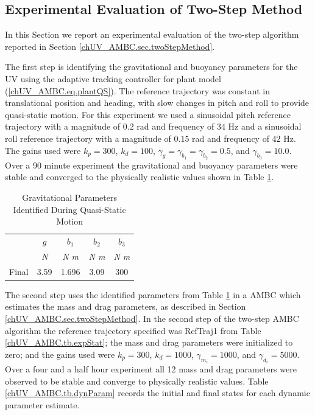 


\subsection{Experimental Evaluation of Two-Step Method}
\label{chUV_AMBC.sec.twoStepExp}

In this Section we report an experimental evaluation of the two-step
algorithm reported in Section \ref{chUV_AMBC.sec.twoStepMethod}.

The first step is identifying the gravitational and buoyancy
parameters for the \ac{UV} using the adaptive tracking controller for
plant model (\ref{chUV_AMBC.eq.plantQS}).  The reference trajectory
was constant in translational position and heading, with slow changes
in pitch and roll to provide quasi-static motion.  For this experiment
we used a sinusoidal pitch reference trajectory with a magnitude of
$0.2$ rad and frequency of $34$ Hz and a sinusoidal roll reference
trajectory with a magnitude of $0.15$ rad and frequency of $42$
Hz. The gains used were $k_p=300$, $k_d=100$,
$\gamma_{g}=\gamma_{b_1}=\gamma_{b_2}=0.5$, and $\gamma_{b_3}=10.0$.
Over a 90 minute experiment the gravitational and buoyancy parameters
were stable and converged to the physically realistic values shown in
Table \ref{chUV_AMBC.tb.quasistatic}.

\begin{table}[htbp]
\ssp
\caption{Gravitational Parameters Identified During Quasi-Static Motion}
\begin{center}
\begin{tabular}{c|cccc}
 & $g$ & $b_1$ & $b_2$ & $b_3$ \\
 & {\it N} & {\it N m} & {\it N m} & {\it N m} \\ \hline
Final & 3.59 & 1.696 & 3.09 & 300 \\
\end{tabular}
\end{center}
\label{chUV_AMBC.tb.quasistatic}
\vspace*{-5mm}
\end{table}


The second step uses the identified parameters from Table
\ref{chUV_AMBC.tb.quasistatic} in a \ac{AMBC} which estimates the
mass and drag parameters, as described in Section
\ref{chUV_AMBC.sec.twoStepMethod}.
%
In the second step of the two-step \ac{AMBC} algorithm the reference
trajectory specified was RefTraj1 from Table
\ref{chUV_AMBC.tb.expStat}; the mass and drag parameters were
initialized to zero; and the gains used were $k_p=300$, $k_d=1000$,
$\gamma_{m_i}=1000$, and $\gamma_{d_i}=5000$.  Over a four and a half
hour experiment all 12 mass and drag parameters were observed to be
stable and converge to physically realistic values.  Table
\ref{chUV_AMBC.tb.dynParam} records the initial and final states for
each dynamic parameter estimate.

